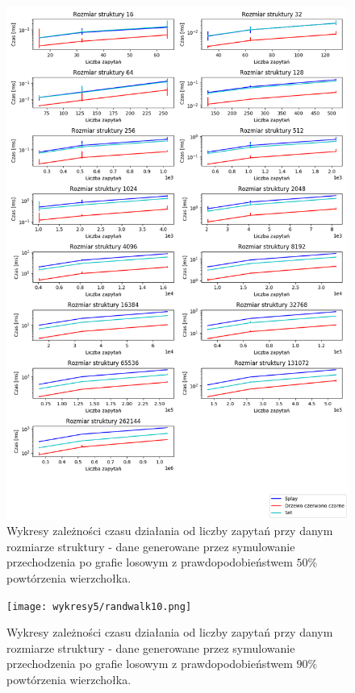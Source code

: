 \documentclass[declaration,shortabstract]{iithesis}
\theoremstyle{thm}
\theoremstyle{remark}
\theoremstyle{plain}
\theoremstyle{plain}
\theoremstyle{plain}
\begin{document}
\begin{figure}[H]  
\centering
    \includegraphics[scale=0.5]{wykresy3/randwalk50.png}
      \caption{Wykresy zależności czasu działania od liczby zapytań przy danym rozmiarze struktury - dane generowane przez symulowanie przechodzenia po grafie losowym z prawdopodobieństwem  \(50\%\) powtórzenia wierzchołka. }  
\end{figure}

\begin{figure}[H]  
\centering
    \texttt{[image: wykresy5/randwalk10.png]}
      \caption{Wykresy zależności czasu działania od liczby zapytań przy danym rozmiarze struktury - dane generowane przez symulowanie przechodzenia po grafie losowym z prawdopodobieństwem  \(90\%\) powtórzenia wierzchołka. }  
\end{figure}
\end{document}
